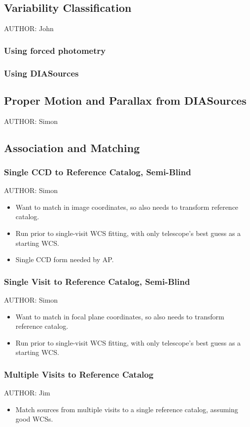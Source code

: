 \subsection{Variability Classification}
AUTHOR: John
\subsubsection{Using forced photometry}
\subsubsection{Using DIASources}

\subsection{Proper Motion and Parallax from DIASources}
AUTHOR: Simon

\subsection{Association and Matching}
\subsubsection{Single CCD to Reference Catalog, Semi-Blind}
AUTHOR: Simon
\begin{itemize}
\item Want to match in image coordinates, so also needs to transform reference catalog.
\item Run prior to single-visit WCS fitting, with only telescope's best guess as a starting WCS.
\item Single CCD form needed by AP.
\end{itemize}

\subsubsection{Single Visit to Reference Catalog, Semi-Blind}
AUTHOR: Simon
\begin{itemize}
\item Want to match in focal plane coordinates, so also needs to transform reference catalog.
\item Run prior to single-visit WCS fitting, with only telescope's best guess as a starting WCS.
\end{itemize}

\subsubsection{Multiple Visits to Reference Catalog}
AUTHOR: Jim
\begin{itemize}
\item Match sources from multiple visits to a single reference catalog, assuming good WCSs.
\end{itemize}

